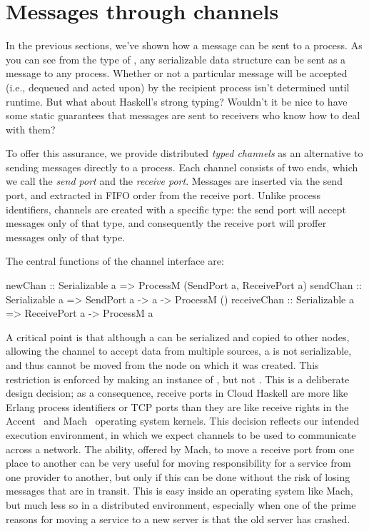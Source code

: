 \documentclass[preprint]{sigplanconf}
\begin{document}
\section{Messages through channels}
In the previous sections, we've shown how a message can be sent to a process. As you can see from the type of , any serializable data structure can be sent as a message to any process. Whether or not a particular message will be accepted (i.e., dequeued and acted upon) by the recipient process isn't determined until runtime. But what about Haskell's strong typing? Wouldn't it be nice to have some static guarantees that messages are sent to receivers who know how to deal with them?

To offer this assurance, we provide distributed {\em typed channels} as an alternative to sending messages directly to a process. Each channel consists of two ends, which we call the {\em send port} and the {\em receive port}. Messages are inserted via the send port, and extracted in FIFO order from the receive port. Unlike process identifiers, channels are created with a specific type: the send port will accept messages only of that type, and consequently the receive port will proffer messages only of that type.

The central functions of the channel interface are:
\par{\small
\begin{code}
newChan  :: Serializable a 
         => ProcessM (SendPort a, ReceivePort a)
sendChan :: Serializable a => SendPort a -> a -> ProcessM ()
receiveChan :: Serializable a => ReceivePort a -> ProcessM a
\end{code}}

A critical point is that although a  can be serialized and copied to other nodes, allowing the channel to accept data from multiple sources, a  is not serializable, and thus cannot be moved from the node on which it was created.
This restriction is enforced by making  an instance of , but not . 
This is a deliberate design decision; as a consequence, receive ports in Cloud Haskell are more like Erlang process identifiers or TCP ports than they are like receive rights in the Accent~\cite{Rashid81} and Mach~\cite[\S4.2.3]{free-s2008} operating system kernels.   
This decision reflects our intended execution environment, in which we expect channels to be used to communicate across a network.  
The ability, offered by Mach, to move a receive port from one place to another can be very useful for moving responsibility for a service from one provider to another, but only if this can be done without the risk of losing messages that are in transit.  
This is easy inside an operating system like Mach, but much less so in a distributed environment, especially when one of the prime reasons for moving a service to a new server is that the old server has crashed.  
\end{document}
